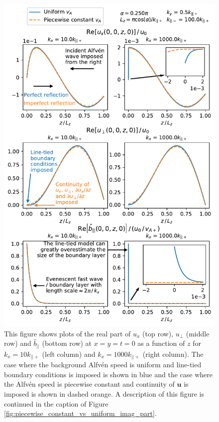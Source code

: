 \documentclass[linenumbers]{aastex63}
\let\vec\boldsymbol
\begin{document}
\begin{figure}
    \centering
    \includegraphics[width=\textwidth,height=0.91\textheight,keepaspectratio]{piecewise_constant_vs_uniform_real_part.pdf}
    \caption{This figure shows plots of the real part of $u_x$ (top row), $u_\perp$ (middle row) and $\hat{b}_{||}$ (bottom row) at $x=y=t=0$ as a function of $z$ for $k_x=10k_{||+}$ (left column) and $k_x = 1000k_{||+}$ (right column). The case where the background Alfv\'en speed is uniform and line-tied boundary conditions is imposed is shown in blue and the case where the Alfv\'en speed is piecewise constant and continuity of $\vec{u}$ is imposed is shown in dashed orange. A description of this figure is continued in the caption of Figure \ref{fig:piecewise_constant_vs_uniform_imag_part}.}
    \label{fig:piecewise_constant_vs_uniform_real_part}
\end{figure}
\end{document}
